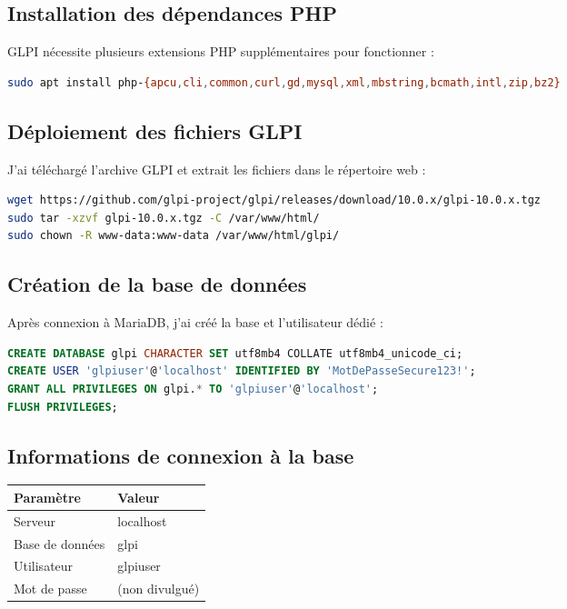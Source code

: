 \documentclass[a4paper,11pt]{article}
\begin{document}
\subsection{Installation des dépendances PHP}

GLPI nécessite plusieurs extensions PHP supplémentaires pour fonctionner :

\begin{lstlisting}[language=bash]
sudo apt install php-{apcu,cli,common,curl,gd,mysql,xml,mbstring,bcmath,intl,zip,bz2}
\end{lstlisting}

\subsection{Déploiement des fichiers GLPI}

J'ai téléchargé l'archive GLPI et extrait les fichiers dans le répertoire web :

\begin{lstlisting}[language=bash]
wget https://github.com/glpi-project/glpi/releases/download/10.0.x/glpi-10.0.x.tgz
sudo tar -xzvf glpi-10.0.x.tgz -C /var/www/html/
sudo chown -R www-data:www-data /var/www/html/glpi/
\end{lstlisting}

\subsection{Création de la base de données}

Après connexion à MariaDB, j'ai créé la base et l'utilisateur dédié :

\begin{lstlisting}[language=SQL]
CREATE DATABASE glpi CHARACTER SET utf8mb4 COLLATE utf8mb4_unicode_ci;
CREATE USER 'glpiuser'@'localhost' IDENTIFIED BY 'MotDePasseSecure123!';
GRANT ALL PRIVILEGES ON glpi.* TO 'glpiuser'@'localhost';
FLUSH PRIVILEGES;
\end{lstlisting}

\subsection{Informations de connexion à la base}

\begin{center}
\begin{tabular}{|l|l|}
\hline
\textbf{Paramètre} & \textbf{Valeur} \\
\hline
Serveur         & localhost \\
Base de données & glpi \\
Utilisateur     & glpiuser \\
Mot de passe    & (non divulgué) \\
\hline
\end{tabular}
\end{center}
\end{document}
